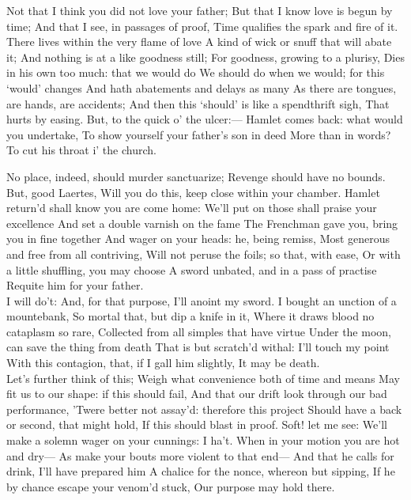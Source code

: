 \documentclass[11pt]{book}
\begin{document}
\2	Not that I think you did not love your father;
	But that I know love is begun by time;
	And that I see, in passages of proof,
	Time qualifies the spark and fire of it.
	There lives within the very flame of love
	A kind of wick or snuff that will abate it;
	And nothing is at a like goodness still;
	For goodness, growing to a plurisy,
	Dies in his own too much: that we would do
	We should do when we would; for this `would' changes
	And hath abatements and delays as many
	As there are tongues, are hands, are accidents;
	And then this `should' is like a spendthrift sigh,
	That hurts by easing. But, to the quick o' the ulcer:---
	Hamlet comes back: what would you undertake,
	To show yourself your father's son in deed
	More than in words? \\

\7	To cut his throat i' the church.

\2	No place, indeed, should murder sanctuarize;
	Revenge should have no bounds. But, good Laertes,
	Will you do this, keep close within your chamber.
	Hamlet return'd shall know you are come home:
	We'll put on those shall praise your excellence
	And set a double varnish on the fame
	The Frenchman gave you, bring you in fine together
	And wager on your heads: he, being remiss,
	Most generous and free from all contriving,
	Will not peruse the foils; so that, with ease,
	Or with a little shuffling, you may choose
	A sword unbated, and in a pass of practise
	Requite him for your father. \\

\7	I will do't:
	And, for that purpose, I'll anoint my sword.
	I bought an unction of a mountebank,
	So mortal that, but dip a knife in it,
	Where it draws blood no cataplasm so rare,
	Collected from all simples that have virtue
	Under the moon, can save the thing from death
	That is but scratch'd withal: I'll touch my point
	With this contagion, that, if I gall him slightly,
	It may be death. \\

\2	                  Let's further think of this;
	Weigh what convenience both of time and means
	May fit us to our shape: if this should fail,
	And that our drift look through our bad performance,
	'Twere better not assay'd: therefore this project
	Should have a back or second, that might hold,
	If this should blast in proof. Soft! let me see:
	We'll make a solemn wager on your cunnings:
   I ha't.
	When in your motion you are hot and dry---
	As make your bouts more violent to that end---
	And that he calls for drink, I'll have prepared him
	A chalice for the nonce, whereon but sipping,
	If he by chance escape your venom'd stuck,
	Our purpose may hold there.
\end{document}
